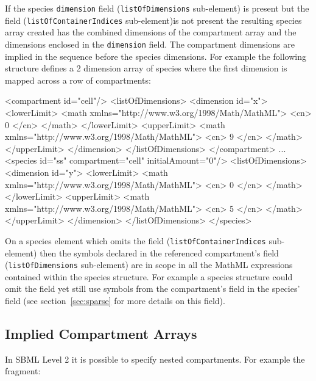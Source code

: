 \documentclass{cekarticle}
\begin{document}
If the species \texttt{dimension} field (\texttt{listOfDimensions} sub-element) is present but
the  field (\texttt{listOfContainerIndices} sub-element)is not present
the resulting species array created has the combined dimensions
of the compartment array and the dimensions enclosed in the \texttt{dimension} field.
The compartment dimensions are implied in the sequence before the species dimensions.
For example the following structure defines a 2
dimension array of species where the first dimension is mapped across a row of compartments:
\begin{example}
<compartment id="cell"/>
    <listOfDimensions>
        <dimension id="x">
            <lowerLimit>
                <math xmlns="http://www.w3.org/1998/Math/MathML">
                    <cn> 0 </cn>
                </math>
            </lowerLimit>
            <upperLimit>
                <math xmlns="http://www.w3.org/1998/Math/MathML">
                    <cn> 9 </cn>
                </math>
            </upperLimit>
        </dimension>
    </listOfDimensions>
</compartment>
...
<species id="ss" compartment="cell" initialAmount="0"/>
    <listOfDimensions>
        <dimension id="y">
            <lowerLimit>
                <math xmlns="http://www.w3.org/1998/Math/MathML">
                    <cn> 0 </cn>
                </math>
            </lowerLimit>
            <upperLimit>
                <math xmlns="http://www.w3.org/1998/Math/MathML">
                    <cn> 5 </cn>
                </math>
            </upperLimit>
        </dimension>
    </listOfDimensions>
</species>
\end{example}

On a species element which omits the  field (\texttt{listOfContainerIndices} sub-element)
then the symbols declared in the referenced compartment's  field (\texttt{listOfDimensions} sub-element)
are in scope in all the MathML expressions contained within the species structure.  For example a species structure
could omit the  field yet still use symbols from the compartment's  field
in the species'  field (see section~\ref{sec:sparse} for more details on this field).

\subsection{Implied Compartment Arrays}

In SBML Level 2 it is possible to specify nested compartments.
For example the fragment:
\end{document}
